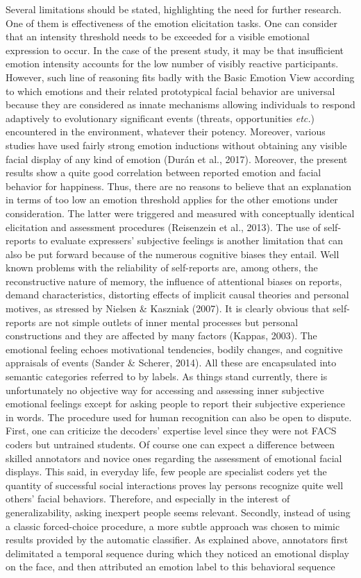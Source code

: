 \documentclass[
  english,
  man]{apa7}
\begin{document}
Several limitations should be stated, highlighting the need for further research. One of them is effectiveness of the emotion elicitation tasks. One can consider that an intensity threshold needs to be exceeded for a visible emotional expression to occur. In the case of the present study, it may be that insufficient emotion intensity accounts for the low number of visibly reactive participants. However, such line of reasoning fits badly with the Basic Emotion View according to which emotions and their related prototypical facial behavior are universal because they are considered as innate mechanisms allowing individuals to respond adaptively to evolutionary significant events (threats, opportunities \emph{etc.}) encountered in the environment, whatever their potency. Moreover, various studies have used fairly strong emotion inductions without obtaining any visible facial display of any kind of emotion (Durán et al., 2017). Moreover, the present results show a quite good correlation between reported emotion and facial behavior for happiness. Thus, there are no reasons to believe that an explanation in terms of too low an emotion threshold applies for the other emotions under consideration. The latter were triggered and measured with conceptually identical elicitation and assessment procedures (Reisenzein et al., 2013). The use of self-reports to evaluate expressers' subjective feelings is another limitation that can also be put forward because of the numerous cognitive biases they entail. Well known problems with the reliability of self-reports are, among others, the reconstructive nature of memory, the influence of attentional biases on reports, demand characteristics, distorting effects of implicit causal theories and personal motives, as stressed by Nielsen \& Kaszniak (2007). It is clearly obvious that self-reports are not simple outlets of inner mental processes but personal constructions and they are affected by many factors (Kappas, 2003). The emotional feeling echoes motivational tendencies, bodily changes, and cognitive appraisals of events (Sander \& Scherer, 2014). All these are encapsulated into semantic categories referred to by labels. As things stand currently, there is unfortunately no objective way for accessing and assessing inner subjective emotional feelings except for asking people to report their subjective experience in words. The procedure used for human recognition can also be open to dispute. First, one can criticize the decoders' expertise level since they were not FACS coders but untrained students. Of course one can expect a difference between skilled annotators and novice ones regarding the assessment of emotional facial displays. This said, in everyday life, few people are specialist coders yet the quantity of successful social interactions proves lay persons recognize quite well others' facial behaviors. Therefore, and especially in the interest of generalizability, asking inexpert people seems relevant. Secondly, instead of using a classic forced-choice procedure, a more subtle approach was chosen to mimic results provided by the automatic classifier. As explained above, annotators first delimitated a temporal sequence during which they noticed an emotional display on the face, and then attributed an emotion label to this behavioral sequence 
\end{document}
